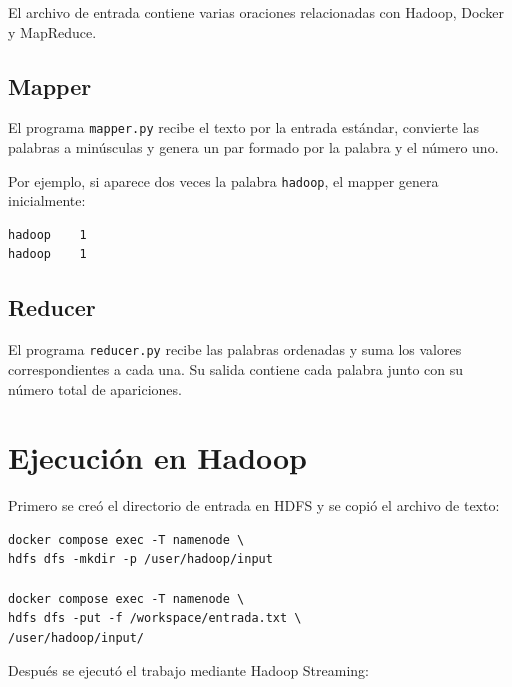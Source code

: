 El archivo de entrada contiene varias oraciones relacionadas con
Hadoop, Docker y MapReduce.



\subsection{Mapper}

El programa \texttt{mapper.py} recibe el texto por la entrada estándar,
convierte las palabras a minúsculas y genera un par formado por la
palabra y el número uno.



Por ejemplo, si aparece dos veces la palabra \texttt{hadoop}, el mapper
genera inicialmente:

\begin{lstlisting}[language={}]
hadoop    1
hadoop    1
\end{lstlisting}

\subsection{Reducer}

El programa \texttt{reducer.py} recibe las palabras ordenadas y suma los
valores correspondientes a cada una. Su salida contiene cada palabra
junto con su número total de apariciones.



\section{Ejecución en Hadoop}

Primero se creó el directorio de entrada en HDFS y se copió el archivo
de texto:

\begin{lstlisting}[language={}, caption={Carga del archivo en HDFS}]
docker compose exec -T namenode \
hdfs dfs -mkdir -p /user/hadoop/input

docker compose exec -T namenode \
hdfs dfs -put -f /workspace/entrada.txt \
/user/hadoop/input/
\end{lstlisting}

Después se ejecutó el trabajo mediante Hadoop Streaming:

